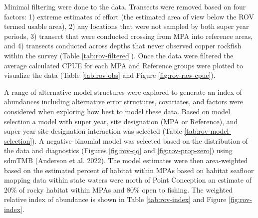 \documentclass[11pt,
  english,
  letterpaper,
]{article}
\begin{document}
Minimal filtering were done to the data. Transects were removed based on four factors: 1) extreme estimates of effort (the estimated area of view below the ROV termed usable area), 2) any locations that were not sampled by both super year periods, 3) transect that were conducted crossing from MPA into reference areas, and 4) transects conducted across depths that never observed copper rockfish within the survey (Table \ref{tab:rov-filtered}). Once the data were filtered the average calculated CPUE for each MPA and Reference groups were plotted to visualize the data (Table \ref{tab:rov-obs} and Figure \ref{fig:rov-raw-cpue}).

A range of alternative model structures were explored to generate an index of abundances including alternative error structures, covariates, and factors were considered when exploring how best to model these data. Based on model selection a model with super year, site designation (MPA or Reference), and super year site designation interaction was selected (Table \ref{tab:rov-model-selection}). A negative-binomial model was selected based on the distribution of the data and diagnostics (Figures \ref{fig:rov-qq} and \ref{fig:rov-prop-zero}) using sdmTMB (Anderson et al. 2022). The model estimates were then area-weighted based on the estimated percent of habitat within MPAs based on habitat seafloor mapping data within state waters were north of Point Conception an estimate of 20\% of rocky habitat within MPAs and 80\% open to fishing. The weighted relative index of abundance is shown in Table \ref{tab:rov-index} and Figure \ref{fig:rov-index}.

\newpage



\newpage



\newpage

\begingroup\fontsize{7}{9}\selectfont
\end{document}

